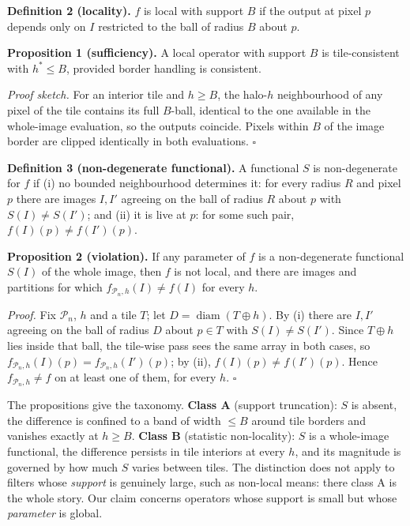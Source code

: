 \documentclass[journal]{IEEEtran}
\begin{document}
\textbf{Definition 2 (locality).} \(f\) is local with support \(B\) if the output at pixel \(p\) depends only on \(I\) restricted to the ball of radius \(B\) about \(p\).

\textbf{Proposition 1 (sufficiency).} A local operator with support \(B\) is tile-consistent with \(h^*\le B\), provided border handling is consistent.

\emph{Proof sketch.} For an interior tile and \(h\ge B\), the halo-\(h\) neighbourhood of any pixel of the tile contains its full \(B\)-ball, identical to the one available in the whole-image evaluation, so the outputs coincide. Pixels within \(B\) of the image border are clipped identically in both evaluations. \(\square\)

\textbf{Definition 3 (non-degenerate functional).} A functional \(S\) is non-degenerate for \(f\) if (i) no bounded neighbourhood determines it: for every radius \(R\) and pixel \(p\) there are images \(I,I'\) agreeing on the ball of radius \(R\) about \(p\) with \(S(I)\ne S(I')\); and (ii) it is live at \(p\): for some such pair, \(f(I)(p)\ne f(I')(p)\).

\textbf{Proposition 2 (violation).} If any parameter of \(f\) is a non-degenerate functional \(S(I)\) of the whole image, then \(f\) is not local, and there are images and partitions for which \(f_{\mathcal P_n,h}(I)\ne f(I)\) for every \(h\).

\emph{Proof.} Fix \(\mathcal P_n\), \(h\) and a tile \(T\); let \(D=\operatorname{diam}(T\oplus h)\). By (i) there are \(I,I'\) agreeing on the ball of radius \(D\) about \(p\in T\) with \(S(I)\ne S(I')\). Since \(T\oplus h\) lies inside that ball, the tile-wise pass sees the same array in both cases, so \(f_{\mathcal P_n,h}(I)(p)=f_{\mathcal P_n,h}(I')(p)\); by (ii), \(f(I)(p)\ne f(I')(p)\). Hence \(f_{\mathcal P_n,h}\ne f\) on at least one of them, for every \(h\). \(\square\)

The propositions give the taxonomy. \textbf{Class A} (support truncation): \(S\) is absent, the difference is confined to a band of width \(\le B\) around tile borders and vanishes exactly at \(h\ge B\). \textbf{Class B} (statistic non-locality): \(S\) is a whole-image functional, the difference persists in tile interiors at every \(h\), and its magnitude is governed by how much \(S\) varies between tiles. The distinction does not apply to filters whose \emph{support} is genuinely large, such as non-local means: there class A is the whole story. Our claim concerns operators whose support is small but whose \emph{parameter} is global.
\end{document}
